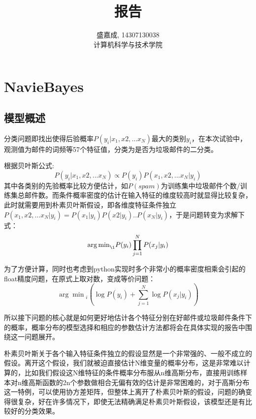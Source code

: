 \documentclass[hyperref,UTF8]{ctexart}
\begin{document}
\title{报告}
\author{盛嘉成, 14307130038 \\ 计算机科学与技术学院}
\maketitle
\section{NavieBayes}
\subsection{模型概述}
分类问题即找出使得后验概率$P(y_{i}|x_{1},x{2},...x_{N})$最大的类别$y_{i}$，在本次试验中，观测值为邮件的词频等57个特征值，分类为是否为垃圾邮件的二分类。
\par
根据贝叶斯公式:\[P(y_{i}|x_{1},x{2},...x_{N})\propto P(y_{i})P(x_{1},x{2},...x_{N}|y_{i})\]其中各类别的先验概率比较方便估计，如$P(spam)$为训练集中垃圾邮件个数/训练集总邮件数。而条件概率密度的估计在输入特征的维度较高时就显得比较复杂，此时就需要用到朴素贝叶斯假设，即各维度特征条件独立$P(x_{1},x{2},...x_{N}|y_{i})=P(x_{1}|y_{i})P(x{2}|y_{i})..P(x_{N}|y_{i})$，于是问题转变为求解下式：
\[{\arg\min}_{\i}P(y_{i})\prod_{j=1}^{N}P(x_{j}|y_{i})\]
\par
为了方便计算，同时也考虑到python实现时多个非常小的概率密度相乘会引起的float精度问题，在原式上取对数，变成等价问题：
\[{\arg\min}_{i}(\log P(y_{i})+\sum_{j=1}^{N}\log P(x_{j}|y_{i}))\]
\par 
所以接下问题的核心就是如何更好地估计各个特征分别在好邮件或垃圾邮件条件下的概率，概率分布的模型选择和相应的参数估计方法都将会在具体实现的报告中围绕这一问题展开。
\par 
朴素贝叶斯关于各个输入特征条件独立的假设显然是一个非常强的、一般不成立的假设。离开这个假设，我们就被迫直接估计N维变量的概率分布，这是非常难以计算的，比如我们假设这N维特征的条件概率分布服从n维高斯分布，直接用训练样本对n维高斯函数的2n个参数做相合无偏有效的估计是非常困难的，对于高斯分布这一特例，可以使用协方差矩阵，但整体上离开了朴素贝叶斯的假设，问题的确变得很复杂，好在许多情况下，即使无法精确满足朴素贝叶斯假设，该模型还是有比较好的分类效果。
\end{document}
